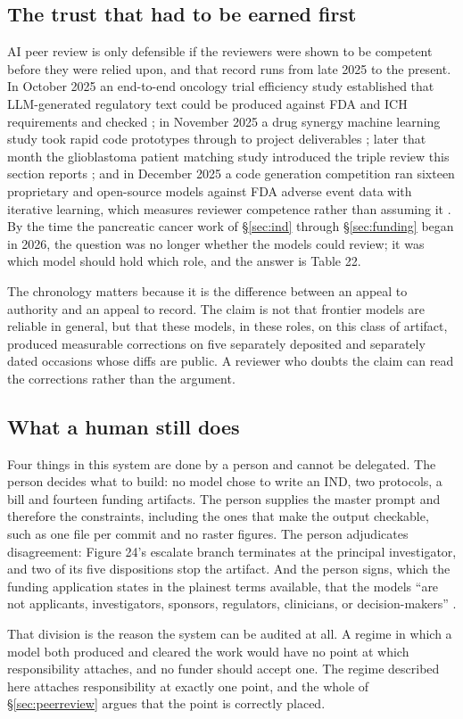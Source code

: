\subsection{The trust that had to be earned first}

AI peer review is only defensible if the reviewers were shown to be competent
before they were relied upon, and that record runs from late 2025 to the
present. In October 2025 an end-to-end oncology trial efficiency study
established that LLM-generated regulatory text could be produced against FDA and
ICH requirements and checked \cite{e2eefficiency2025}; in November 2025 a drug
synergy machine learning study took rapid code prototypes through to project
deliverables \cite{gbmsynergy2025}; later that month the glioblastoma patient
matching study introduced the triple review this section reports
\cite{aiprgliomatc}; and in December 2025 a code generation competition ran
sixteen proprietary and open-source models against FDA adverse event data with
iterative learning, which measures reviewer competence rather than assuming it
\cite{codegencomp2025}. By the time the pancreatic cancer work of
\S\ref{sec:ind} through \S\ref{sec:funding} began in 2026, the question was no
longer whether the models could review; it was which model should hold which
role, and the answer is Table 22.

The chronology matters because it is the difference between an appeal to
authority and an appeal to record. The claim is not that frontier models are
reliable in general, but that these models, in these roles, on this class of
artifact, produced measurable corrections on five separately deposited and
separately dated occasions whose diffs are public. A reviewer who doubts the
claim can read the corrections rather than the argument.

\subsection{What a human still does}

Four things in this system are done by a person and cannot be delegated. The
person decides what to build: no model chose to write an IND, two protocols, a
bill and fourteen funding artifacts. The person supplies the master prompt and
therefore the constraints, including the ones that make the output checkable,
such as one file per commit and no raster figures. The person adjudicates
disagreement: Figure 24's escalate branch terminates at the principal
investigator, and two of its five dispositions stop the artifact. And the person
signs, which the funding application states in the plainest terms available,
that the models ``are not applicants, investigators, sponsors, regulators,
clinicians, or decision-makers'' \cite{rfarm27001v2}.

That division is the reason the system can be audited at all. A regime in which
a model both produced and cleared the work would have no point at which
responsibility attaches, and no funder should accept one. The regime described
here attaches responsibility at exactly one point, and the whole of
\S\ref{sec:peerreview} argues that the point is correctly placed.
